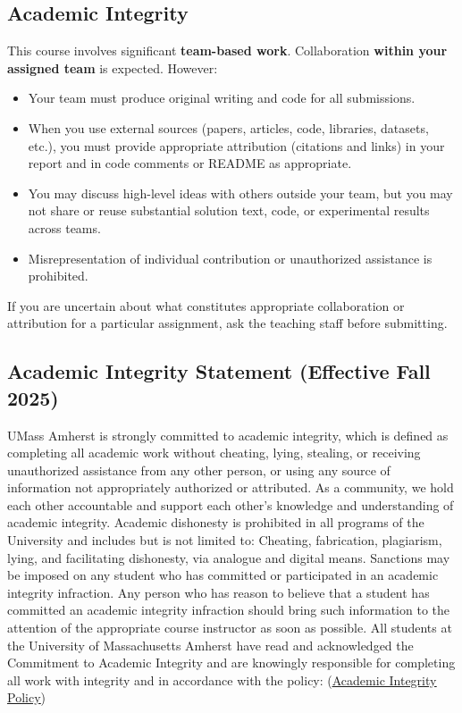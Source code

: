 \documentclass[11pt]{article}
\newcommand{\link}[2]{\href{#1}{\uline{#2}}}
\begin{document}
\subsection*{Academic Integrity}
This course involves significant \textbf{team-based work}. Collaboration \textbf{within your assigned team} is expected. However:
\begin{itemize}
  \item Your team must produce original writing and code for all submissions.
  \item When you use external sources (papers, articles, code, libraries, datasets, etc.), you must provide appropriate attribution (citations and links) in your report and in code comments or README as appropriate.
  \item You may discuss high-level ideas with others outside your team, but you may not share or reuse substantial solution text, code, or experimental results across teams.
  \item Misrepresentation of individual contribution or unauthorized assistance is prohibited.
\end{itemize}
If you are uncertain about what constitutes appropriate collaboration or attribution for a particular assignment, ask the teaching staff before submitting.

\subsection*{Academic Integrity Statement (Effective Fall 2025)}
UMass Amherst is strongly committed to academic integrity, which is defined as completing all academic work without cheating, lying, stealing, or receiving unauthorized assistance from any other person, or using any source of information not appropriately authorized or attributed. As a community, we hold each other accountable and support each other’s knowledge and understanding of academic integrity. Academic dishonesty is prohibited in all programs of the University and includes but is not limited to: Cheating, fabrication, plagiarism, lying, and facilitating dishonesty, via analogue and digital means. Sanctions may be imposed on any student who has committed or participated in an academic integrity infraction. Any person who has reason to believe that a student has committed an academic integrity infraction should bring such information to the attention of the appropriate course instructor as soon as possible. All students at the University of Massachusetts Amherst have read and acknowledged the Commitment to Academic Integrity and are knowingly responsible for completing all work with integrity and in accordance with the policy: (\link{https://www.umass.edu/senate/book/academic-regulations-academic-integrity-policy}{Academic Integrity Policy})
\end{document}
